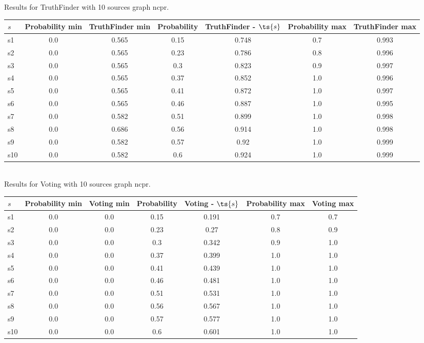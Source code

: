 \documentclass{article}
\begin{document}
\noindent Results for TruthFinder with 10 sources graph ncpr.

\noindent\begin{tabular}{|l|c|c|c|c|c|c|}
\hline
$s$& Probability min & TruthFinder min & Probability & TruthFinder - $\ts{s}$ & Probability max & TruthFinder max\\
\hline
s1 &0.0 & 0.565 & 0.15 & 0.748 & 0.7 & 0.993\\
\hline
s2 &0.0 & 0.565 & 0.23 & 0.786 & 0.8 & 0.996\\
\hline
s3 &0.0 & 0.565 & 0.3 & 0.823 & 0.9 & 0.997\\
\hline
s4 &0.0 & 0.565 & 0.37 & 0.852 & 1.0 & 0.996\\
\hline
s5 &0.0 & 0.565 & 0.41 & 0.872 & 1.0 & 0.997\\
\hline
s6 &0.0 & 0.565 & 0.46 & 0.887 & 1.0 & 0.995\\
\hline
s7 &0.0 & 0.582 & 0.51 & 0.899 & 1.0 & 0.998\\
\hline
s8 &0.0 & 0.686 & 0.56 & 0.914 & 1.0 & 0.998\\
\hline
s9 &0.0 & 0.582 & 0.57 & 0.92 & 1.0 & 0.999\\
\hline
s10 &0.0 & 0.582 & 0.6 & 0.924 & 1.0 & 0.999\\
\hline
\end{tabular}\\

\noindent Results for Voting with 10 sources graph ncpr.

\noindent\begin{tabular}{|l|c|c|c|c|c|c|}
\hline
$s$& Probability min & Voting min & Probability & Voting - $\ts{s}$ & Probability max & Voting max\\
\hline
s1 &0.0 & 0.0 & 0.15 & 0.191 & 0.7 & 0.7\\
\hline
s2 &0.0 & 0.0 & 0.23 & 0.27 & 0.8 & 0.9\\
\hline
s3 &0.0 & 0.0 & 0.3 & 0.342 & 0.9 & 1.0\\
\hline
s4 &0.0 & 0.0 & 0.37 & 0.399 & 1.0 & 1.0\\
\hline
s5 &0.0 & 0.0 & 0.41 & 0.439 & 1.0 & 1.0\\
\hline
s6 &0.0 & 0.0 & 0.46 & 0.481 & 1.0 & 1.0\\
\hline
s7 &0.0 & 0.0 & 0.51 & 0.531 & 1.0 & 1.0\\
\hline
s8 &0.0 & 0.0 & 0.56 & 0.567 & 1.0 & 1.0\\
\hline
s9 &0.0 & 0.0 & 0.57 & 0.577 & 1.0 & 1.0\\
\hline
s10 &0.0 & 0.0 & 0.6 & 0.601 & 1.0 & 1.0\\
\hline
\end{tabular}\\
\end{document}
